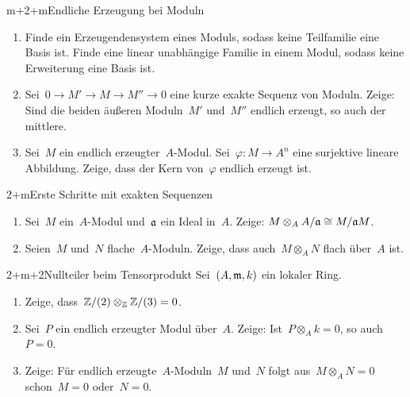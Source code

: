 \documentclass{uebblatt}
\begin{document}

\begin{aufgabe}{m+2+m}{Endliche Erzeugung bei Moduln}
\begin{enumerate}
\item Finde ein Erzeugendensystem eines Moduls, sodass keine Teilfamilie eine
Basis ist. Finde eine linear unabhängige Familie in einem Modul, sodass keine
Erweiterung eine Basis ist.
\item Sei~$0 \to M' \to M \to M'' \to 0$ eine kurze exakte Sequenz von Moduln.
Zeige: Sind die beiden äußeren Moduln~$M'$ und~$M''$ endlich erzeugt, so auch der mittlere.
\item Sei~$M$ ein endlich erzeugter~$A$-Modul. Sei~$\varphi : M \to A^n$ eine
surjektive lineare Abbildung. Zeige, dass der Kern von~$\varphi$ endlich
erzeugt ist.
\end{enumerate}
\end{aufgabe}

\begin{aufgabe}{2+m}{Erste Schritte mit exakten Sequenzen}
\begin{enumerate}
\item Sei~$M$ ein~$A$-Modul und~$\mathfrak{a}$ ein Ideal in~$A$. Zeige: $M \otimes_A
A/\mathfrak{a} \cong M/\mathfrak{a} M$.
\item Seien~$M$ und~$N$ flache~$A$-Moduln. Zeige, dass auch~$M \otimes_A N$
flach über~$A$ ist.
\end{enumerate}
\end{aufgabe}

\begin{aufgabe}{2+m+2}{Nullteiler beim Tensorprodukt}
Sei~$(A,\mathfrak{m},k)$ ein lokaler Ring.
\begin{enumerate}
\item Zeige, dass~$\mathbb{Z}/(2) \otimes_{\mathbb{Z}} \mathbb{Z}/(3) = 0$.
\item Sei~$P$ ein endlich erzeugter Modul über~$A$.
Zeige: Ist~$P \otimes_A k = 0$, so auch~$P = 0$.
\item Zeige: Für endlich erzeugte~$A$-Moduln~$M$ und~$N$ folgt aus~$M \otimes_A
N = 0$ schon~$M = 0$ oder~$N = 0$.
\end{enumerate}
\end{aufgabe}
\end{document}
